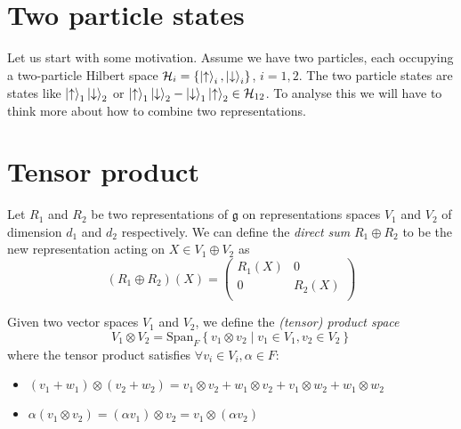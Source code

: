 \section{Two particle states}%
\label{sec:two_particle_states}

Let us start with some motivation.
Assume we have two particles, each occupying a two-particle Hilbert space $\mathcal{H}_i = \left\{ \ket{\uparrow}_i, \ket{\downarrow}_i \right\}$, $i = 1, 2$.
The two particle states are states like $\ket{\uparrow}_1 \ket{\downarrow}_2$ or $\ket{\uparrow}_1 \ket{\downarrow}_2 - \ket{\downarrow}_1 \ket{\uparrow}_2 \in \mathcal{H}_{12}$.
To analyse this we will have to think more about how to combine two representations.

\section{Tensor product}%
\label{sec:tensor_product}

\begin{definition}[]
  Let $R_1$ and $R_2$ be two representations of $\mathfrak{g}$ on representations spaces $V_1$ and $V_2$ of dimension $d_1$ and $d_2$ respectively.
  We can define the \emph{direct sum} $R_1 \oplus R_2$ to be the new representation acting on $X \in V_1 \oplus V_2$ as
  \begin{equation}
    (R_1 \oplus R_2)(X) = 
    \begin{pmatrix}
      R_1(X) & 0 \\
      0 & R_2(X) \\
    \end{pmatrix}
  \end{equation}
\end{definition}

\begin{definition}[]
  Given two vector spaces $V_1$ and $V_2$, we define the \emph{(tensor) product space}
  \begin{equation}
    V_1 \otimes V_2 = \text{Span}_F \left\{ v_1 \otimes v_2 \mid v_1 \in V_1, v_2 \in V_2 \right\}
  \end{equation}
  where the tensor product satisfies $\forall v_i \in V_i, \alpha \in F$:
  \begin{itemize}
    \item $(v_1 + w_1) \otimes (v_2 + w_2) = v_1 \otimes v_2 + w_1 \otimes v_2 + v_1 \otimes w_2 + w_1 \otimes w_2$
    \item $\alpha(v_1 \otimes v_2) = (\alpha v_1) \otimes v_2 = v_1 \otimes (\alpha v_2)$
  \end{itemize}
\end{definition}

